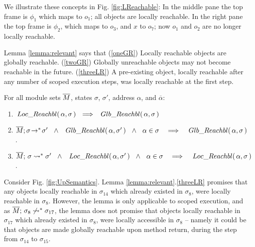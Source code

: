 We illustrate these concepts in Fig. \ref{fig:LReachable}: In the middle pane the top frame is $\phi_1$ which maps  to $o_1$; all objects are locally reachable. 
In the right pane the top frame is $\phi_2$, which maps  to $o_3$, and $x$ to $o_7$; now $o_1$ and $o_2$ are no longer locally reachable.

Lemma  \ref{lemma:relevant} %
says that  (\ref{oneGR}) Locally reachable objects are globally reachable. 
(\ref{twoGR}) 
Globally unreachable objects may not become reachable in the future.
(\ref{threeLR}) A pre-existing object, locally reachable after any number of scoped execution steps, was locally reachable at the first step.


\begin{lemma}
\label{lemma:relevant}
For all module sets $\overline{M}$, states $\sigma$, $\sigma'$,   address $\alpha$, and $\overline \alpha$:
\begin{enumerate}
\item
\label{oneGR}
$ \LRelevant \alpha \sigma\ \ \Longrightarrow \ \   \GRelevant \alpha \sigma$
\item
\label{twoGR}
${\leadstoOrigStar {\Mtwo}  {\sigma}  {\sigma'}} \ \ \wedge \ \  \GRelevant \alpha {\sigma'} \ \ \wedge\ \  {\alpha\in \sigma} \ \ \ \Longrightarrow \ \  \ \GRelevant \alpha {\sigma}$.
\item
\label{threeLR}
${\leadstoBoundedStar {\Mtwo}  {\sigma}    {\sigma'}} \ \ \wedge \ \   \LRelevant \alpha {\sigma'}\  \ \wedge\ \  {\alpha\in \sigma} \ \ \ \Longrightarrow \ \ \ \LRelevant \alpha {\sigma}$.
\end{enumerate}
\end{lemma}

{Consider Fig.  \ref{fig:UpSemantics}. %
Lemma \ref{lemma:relevant}.\ref{threeLR}  promises that any objects locally reachable in $\sigma_{14}$ which already existed in $\sigma_{8}$, were locally reachable in $\sigma_{8}$. However, the lemma is only  applicable to scoped execution, and as 
$\overline{M};\, {\sigma_8} \not\rightsquigarrow^* \sigma_{17}$, 
the lemma does not promise that  objects locally reachable in $\sigma_{17}$ which already existed in $\sigma_{8}$, were locally accessible in $\sigma_{8}$ -- namely it could be that objects are made globally reachable upon method return, during the step from $\sigma_{14}$ to $\sigma_{15}$.}

